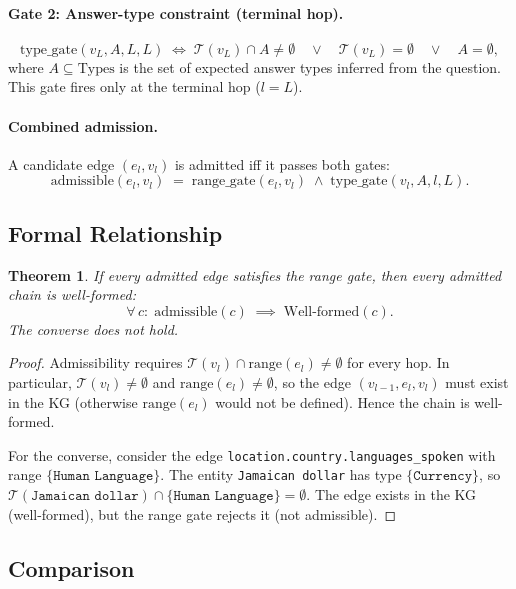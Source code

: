 \documentclass[11pt,a4paper]{article}
\newcommand{\T}{\mathcal{T}}
\newcommand{\Types}{\mathrm{Types}}
\newcommand{\range}{\mathrm{range}}
\newtheorem{theorem}{Theorem}
\begin{document}
\paragraph{Gate 2: Answer-type constraint (terminal hop).}
\[
  \text{type\_gate}(v_L, A, L, L)
  \;\iff\;
  \T(v_L) \cap A \neq \emptyset
  \quad\lor\quad
  \T(v_L) = \emptyset
  \quad\lor\quad
  A = \emptyset,
\]
where $A \subseteq \Types$ is the set of expected answer types inferred
from the question.  This gate fires only at the terminal hop ($l = L$).

\paragraph{Combined admission.}
A candidate edge $(e_l, v_l)$ is admitted iff it passes both gates:
\[
  \text{admissible}(e_l, v_l)
  \;=\;
  \text{range\_gate}(e_l, v_l)
  \;\land\;
  \text{type\_gate}(v_l, A, l, L).
\]

\subsection{Formal Relationship}

\begin{theorem}
\label{thm:strict}
If every admitted edge satisfies the range gate, then every admitted
chain is well-formed:
\[
  \forall\, c:\;
  \text{admissible}(c) \;\implies\; \text{Well-formed}(c).
\]
The converse does not hold.
\end{theorem}

\begin{proof}
Admissibility requires $\T(v_l) \cap \range(e_l) \neq \emptyset$ for
every hop.  In particular, $\T(v_l) \neq \emptyset$ and
$\range(e_l) \neq \emptyset$, so the edge $(v_{l-1}, e_l, v_l)$ must
exist in the KG (otherwise $\range(e_l)$ would not be defined).
Hence the chain is well-formed.

For the converse, consider the edge
\texttt{location.country.languages\_spoken}
with range $\{\texttt{Human Language}\}$.  The entity
\texttt{Jamaican dollar} has type $\{\texttt{Currency}\}$, so
$\T(\texttt{Jamaican dollar}) \cap \{\texttt{Human Language}\}
= \emptyset$.  The edge exists in the KG (well-formed), but the range
gate rejects it (not admissible).
\end{proof}

\subsection{Comparison}
\end{document}
